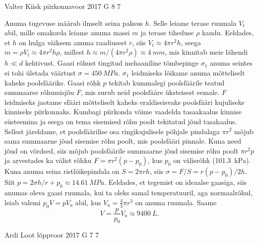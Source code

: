 \documentclass[11pt, twoside]{article}
\begin{document}
{%
{Valter Kiisk} %
{piirkonnavoor} %
{2017} %
{G 8} %
{7} %
{

\ifSolution
Anuma tugevuse määrab ilmselt seina paksus $h$. Selle leiame terase ruumala $V_t$ abil, mille omakorda leiame anuma massi $m$ ja terase tiheduse $\rho$ kaudu. Eeldades, et $h$ on hulga väiksem anuma raadiusest $r$, siis $V_t\approx4\pi r^2 h$, seega $m=\rho V_t \approx 4\pi r^2h\rho$, millest $h\approx m/(4\pi r^2\rho)\approx \SI{4}{mm}$, mis kinnitab meie lähendi $h\ll d$ kehtivust. Gaasi rõhust tingitud mehaaniline tõmbepinge $\sigma_1$ anuma seintes ei tohi ületada väärtust $\sigma=\SI{450}{MPa}$. $\sigma_1$ leidmiseks lõikame anuma mõtteliselt kaheks poolsfääriks.
Gaasi rõhk $p$ tekitab kummalegi poolsfäärile teatud summaarse rõhumisjõu $F$, mis surub neid poolsfääre üksteisest eemale. $F$ leidmiseks jaotame sfääri mõtteliselt kaheks eraldiseisvaks poolsfääri kujuliseks kinniseks piirkonnaks. Kumbagi piirkonda võime vaadelda tasaakaalus kinnise süsteemina ja seega on tema sisemised rõhu poolt tekitatud jõud tasakaalus. Sellest järeldame, et poolsfäärilise osa ringikujulisele põhjale pindalaga $\pi r^2$ mõjub sama summaarne jõud sisemise rõhu poolt, mis poolsfääri pinnale. Kuna need jõud on võrdsed, siis mõjub poolsfäärile summaarne jõud sisemise rõhu poolt $\pi r^2 p$ ja arvestades ka välist rõhku $F=\pi r^2(p-p_0)$, kus $p_0$ on välisrõhk (\SI{101.3}{kPa}). Kuna anuma seina ristlõikepindala on $S=2\pi rh$, siis $\sigma=F/S=r(p-p_0)/2h$. Siit $p=2\sigma h/r+p_0\approx \SI{14.61}{MPa}$. Eeldades, et tegemist on ideaalse gaasiga, siis anumas oleva gaasi ruumala, kui ta oleks samal temperatuuril, aga normaalrõhul, leiab valemi $p_0V=pV_a$ abil, kus $V_a=\frac{4}{3}\pi r^3$ on anuma ruumala. Saame
\[
V=\frac{p}{p_0}V_a\approx\SI{9400}{L}.
\]
\fi
}

{Ardi Loot} %
{lõppvoor} %
{2017} %
{G 7} %
{7} %
{

}}
\end{document}
